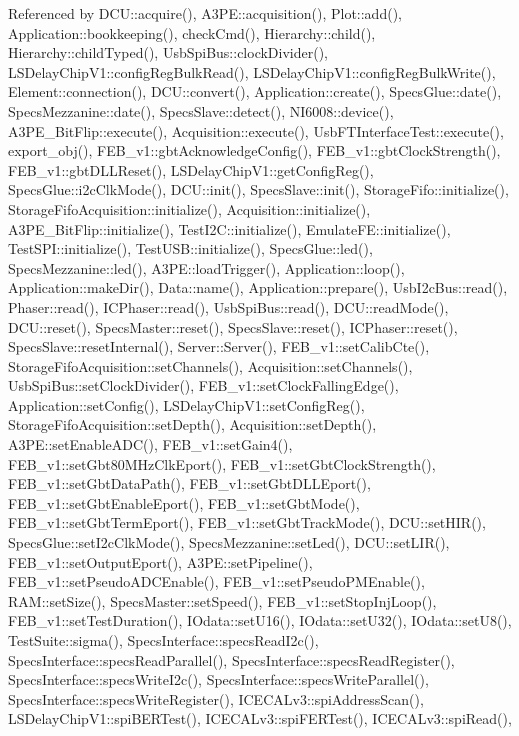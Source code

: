 Referenced by D\+C\+U\+::acquire(), A3\+P\+E\+::acquisition(), Plot\+::add(), Application\+::bookkeeping(), check\+Cmd(), Hierarchy\+::child(), Hierarchy\+::child\+Typed(), Usb\+Spi\+Bus\+::clock\+Divider(), L\+S\+Delay\+Chip\+V1\+::config\+Reg\+Bulk\+Read(), L\+S\+Delay\+Chip\+V1\+::config\+Reg\+Bulk\+Write(), Element\+::connection(), D\+C\+U\+::convert(), Application\+::create(), Specs\+Glue\+::date(), Specs\+Mezzanine\+::date(), Specs\+Slave\+::detect(), N\+I6008\+::device(), A3\+P\+E\+\_\+\+Bit\+Flip\+::execute(), Acquisition\+::execute(), Usb\+F\+T\+Interface\+Test\+::execute(), export\+\_\+obj(), F\+E\+B\+\_\+v1\+::gbt\+Acknowledge\+Config(), F\+E\+B\+\_\+v1\+::gbt\+Clock\+Strength(), F\+E\+B\+\_\+v1\+::gbt\+D\+L\+L\+Reset(), L\+S\+Delay\+Chip\+V1\+::get\+Config\+Reg(), Specs\+Glue\+::i2c\+Clk\+Mode(), D\+C\+U\+::init(), Specs\+Slave\+::init(), Storage\+Fifo\+::initialize(), Storage\+Fifo\+Acquisition\+::initialize(), Acquisition\+::initialize(), A3\+P\+E\+\_\+\+Bit\+Flip\+::initialize(), Test\+I2\+C\+::initialize(), Emulate\+F\+E\+::initialize(), Test\+S\+P\+I\+::initialize(), Test\+U\+S\+B\+::initialize(), Specs\+Glue\+::led(), Specs\+Mezzanine\+::led(), A3\+P\+E\+::load\+Trigger(), Application\+::loop(), Application\+::make\+Dir(), Data\+::name(), Application\+::prepare(), Usb\+I2c\+Bus\+::read(), Phaser\+::read(), I\+C\+Phaser\+::read(), Usb\+Spi\+Bus\+::read(), D\+C\+U\+::read\+Mode(), D\+C\+U\+::reset(), Specs\+Master\+::reset(), Specs\+Slave\+::reset(), I\+C\+Phaser\+::reset(), Specs\+Slave\+::reset\+Internal(), Server\+::\+Server(), F\+E\+B\+\_\+v1\+::set\+Calib\+Cte(), Storage\+Fifo\+Acquisition\+::set\+Channels(), Acquisition\+::set\+Channels(), Usb\+Spi\+Bus\+::set\+Clock\+Divider(), F\+E\+B\+\_\+v1\+::set\+Clock\+Falling\+Edge(), Application\+::set\+Config(), L\+S\+Delay\+Chip\+V1\+::set\+Config\+Reg(), Storage\+Fifo\+Acquisition\+::set\+Depth(), Acquisition\+::set\+Depth(), A3\+P\+E\+::set\+Enable\+A\+D\+C(), F\+E\+B\+\_\+v1\+::set\+Gain4(), F\+E\+B\+\_\+v1\+::set\+Gbt80\+M\+Hz\+Clk\+Eport(), F\+E\+B\+\_\+v1\+::set\+Gbt\+Clock\+Strength(), F\+E\+B\+\_\+v1\+::set\+Gbt\+Data\+Path(), F\+E\+B\+\_\+v1\+::set\+Gbt\+D\+L\+L\+Eport(), F\+E\+B\+\_\+v1\+::set\+Gbt\+Enable\+Eport(), F\+E\+B\+\_\+v1\+::set\+Gbt\+Mode(), F\+E\+B\+\_\+v1\+::set\+Gbt\+Term\+Eport(), F\+E\+B\+\_\+v1\+::set\+Gbt\+Track\+Mode(), D\+C\+U\+::set\+H\+I\+R(), Specs\+Glue\+::set\+I2c\+Clk\+Mode(), Specs\+Mezzanine\+::set\+Led(), D\+C\+U\+::set\+L\+I\+R(), F\+E\+B\+\_\+v1\+::set\+Output\+Eport(), A3\+P\+E\+::set\+Pipeline(), F\+E\+B\+\_\+v1\+::set\+Pseudo\+A\+D\+C\+Enable(), F\+E\+B\+\_\+v1\+::set\+Pseudo\+P\+M\+Enable(), R\+A\+M\+::set\+Size(), Specs\+Master\+::set\+Speed(), F\+E\+B\+\_\+v1\+::set\+Stop\+Inj\+Loop(), F\+E\+B\+\_\+v1\+::set\+Test\+Duration(), I\+Odata\+::set\+U16(), I\+Odata\+::set\+U32(), I\+Odata\+::set\+U8(), Test\+Suite\+::sigma(), Specs\+Interface\+::specs\+Read\+I2c(), Specs\+Interface\+::specs\+Read\+Parallel(), Specs\+Interface\+::specs\+Read\+Register(), Specs\+Interface\+::specs\+Write\+I2c(), Specs\+Interface\+::specs\+Write\+Parallel(), Specs\+Interface\+::specs\+Write\+Register(), I\+C\+E\+C\+A\+Lv3\+::spi\+Address\+Scan(), L\+S\+Delay\+Chip\+V1\+::spi\+B\+E\+R\+Test(), I\+C\+E\+C\+A\+Lv3\+::spi\+F\+E\+R\+Test(), I\+C\+E\+C\+A\+Lv3\+::spi\+Read(), 